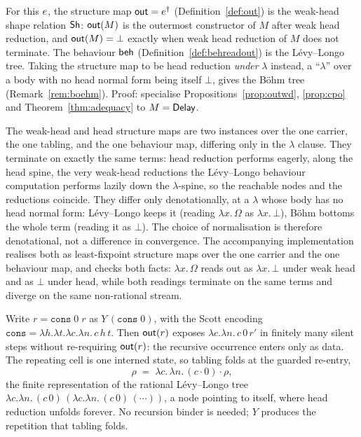 \begin{proposition}\label{prop:shisout}
  For this $e$, the structure map $\mathsf{out} = e^{\dagger}$ (Definition~\ref{def:out}) is the
  weak-head shape relation $\mathsf{Sh}$: $\mathsf{out}(M)$ is the outermost constructor of $M$ after weak head
  reduction, and $\mathsf{out}(M) = \bot$ exactly when weak head reduction of $M$ does not terminate. The
  behaviour $\mathsf{beh}$ (Definition~\ref{def:behreadout}) is the L\'evy--Longo tree. Taking the structure
  map to be head reduction \emph{under} $\lambda$ instead, a ``$\lambda$'' over a body with no head
  normal form being itself $\bot$, gives the B\"ohm tree (Remark~\ref{rem:boehm}). Proof: specialise
  Propositions~\ref{prop:outwd}, \ref{prop:cpo} and Theorem~\ref{thm:adequacy} to $M = \mathsf{Delay}$.
\end{proposition}

\begin{remark}\label{rem:boehm}
  The weak-head and head structure maps are two instances over the one carrier, the one tabling, and
  the one behaviour map, differing only in the $\lambda$ clause. They terminate on exactly the same terms:
  head reduction performs eagerly, along the head spine, the very weak-head reductions the L\'evy--Longo
  behaviour computation performs lazily down the $\lambda$-spine, so the reachable nodes and the reductions coincide.
  They differ only denotationally, at a $\lambda$ whose body has no head normal form: L\'evy--Longo
  keeps it (reading $\lambda x.\,\Omega$ as $\lambda x.\,\bot$), B\"ohm bottoms the whole term (reading
  it as $\bot$). The choice of normalisation is therefore denotational, not a difference in
  convergence. The accompanying implementation realises both as least-fixpoint structure maps over the one
  carrier and the one behaviour map, and checks both facts: $\lambda x.\,\Omega$ reads out as
  $\lambda x.\,\bot$ under weak head and as $\bot$ under head, while both readings terminate on the same
  terms and diverge on the same non-rational stream.
\end{remark}

\begin{example}\label{ex:cons}
  Write $r = \mathtt{cons}\;0\;r$ as $Y\,(\mathtt{cons}\;0)$, with the Scott encoding
  $\mathtt{cons} = \lambda h.\lambda t.\lambda c.\lambda n.\,c\,h\,t$. Then $\mathsf{out}(r)$ exposes
  $\lambda c.\lambda n.\,c\,0\,r'$ in finitely many silent steps without re-requiring $\mathsf{out}(r)$: the
  recursive occurrence enters only as data. The repeating cell is one interned state, so tabling
  folds at the guarded re-entry,
  \[
    \rho \;=\; \lambda c.\,\lambda n.\,(c\cdot 0)\cdot\rho,
  \]
  the finite representation of the rational L\'evy--Longo tree
  $\lambda c.\lambda n.\,(c\,0)\,(\lambda c.\lambda n.\,(c\,0)\,(\cdots))$, a node pointing to itself,
  where head reduction unfolds forever. No recursion binder is needed; $Y$ produces the repetition that
  tabling folds.
\end{example}

